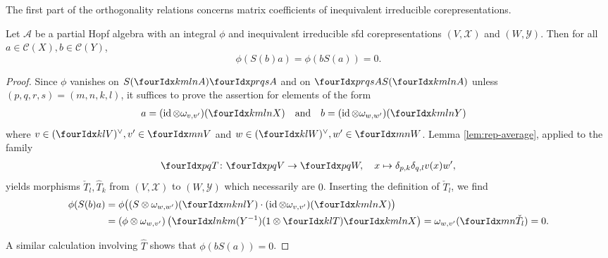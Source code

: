 The first part of the orthogonality relations concerns matrix
coefficients of inequivalent irreducible corepresentations. 
\begin{Prop} \label{prop:rep-orthogonality-1} Let $\mathcal{A}$ be a
  partial Hopf algebra with an integral $\phi$ and inequivalent
  irreducible sfd corepresentations $(V,\mathscr{X})$ and
  $(W,\mathscr{Y})$.  Then  for all
  $a\in \mathcal{C}(X), b \in \mathcal{C}(Y)$,
  \[\phi(S(b)a) = \phi(bS(a))=0.\]
\end{Prop}
\begin{proof}
Since $\phi$ vanishes on $S(\Gr{A}{k}{l}{m}{n})\Gr{A}{p}{q}{r}{s}$ and
on $\Gr{A}{p}{q}{r}{s}S(\Gr{A}{k}{l}{m}{n})$ unless
$(p,q,r,s) = (m,n,k,l)$, it suffices to prove the assertion for  elements of the form
\begin{align*}
  a&=(\id \otimes \omega_{v,v'})(\Gr{X}{k}{l}{m}{n})  && \text{and} &
  b&=(\id \otimes \omega_{w,w'})(\Gr{Y}{k}{l}{m}{n})
\end{align*}
where $v\in \dual{(\Gru{V}{k}{l})}, v' \in \Gru{V}{m}{n}$ and $w \in
\dual{(\Gru{W}{k}{l})}, w' \in \Gru{W}{m}{n}$.  Lemma
\ref{lem:rep-average}, applied to the family
  \begin{align*}
    \Gru{T}{p}{q} \colon \Gru{V}{p}{q} \to \Gru{W}{p}{q}, \quad x
    \mapsto  \delta_{p,k}\delta_{q,l}  v(x)w',
  \end{align*}
  yields morphisms $\check{T}_l,\hat{T}_k$ from $(V,\mathscr{X})$ to
  $(W,\mathscr{Y})$ which necessarily are $0$. Inserting the
  definition of $\check{T}_l$, we find
  \begin{align*}
    \phi(S(b)a) &= \phi\big((S \otimes
    \omega_{w,w'})(\Gr{Y}{m}{n}{k}{l}) \cdot (\id \otimes
    \omega_{v,v'})(\Gr{X}{k}{l}{m}{n})\big) \\ &= (\phi \otimes \omega_{w,v'})\left(\Gr{(Y^{-1})}{l}{k}{n}{m}(1 \otimes
      \Gru{T}{k}{l} )     \Gr{X}{k}{l}{m}{n}\right) 
    = \omega_{w,v'}( \Gru{\check{T}_l}{m}{n}) = 0.
  \end{align*}%
  
  A similar calculation involving $\hat{T}$ shows that
  $\phi(bS(a))=0$.  
\end{proof}

